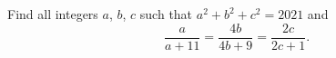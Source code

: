 Find all integers $a$, $b$, $c$ such that $a^2+b^2+c^2=2021$ and
\[\dfrac{a}{a+11}=\dfrac{4b}{4b+9}=\dfrac{2c}{2c+1}.\]
